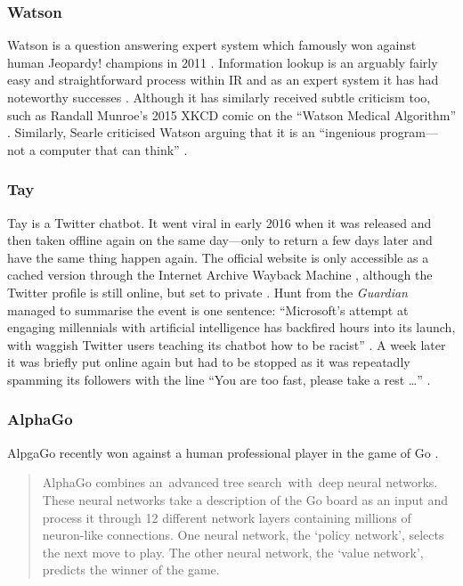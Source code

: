 \subsubsection{Watson} 
Watson is a question answering expert system which famously won against human Jeopardy! champions in 2011 \autocite{IBM2016}. Information lookup is an arguably fairly easy and straightforward process within \ac{IR} and as an expert system it has had noteworthy successes \autocite{Fingas2016}. Although it has similarly received subtle criticism too, such as Randall Munroe's 2015 XKCD comic on the ``Watson Medical Algorithm'' \autocite*{Munroe2015}. Similarly, Searle criticised Watson arguing that it is an ``ingenious program---not a computer that can think'' \autocite*{Searle2011}.

\subsubsection{Tay}
Tay is a Twitter chatbot. It went viral in early 2016 when it was released and then taken offline again on the same day---only to return a few days later and have the same thing happen again. The official website is only accessible as a cached version through the Internet Archive Wayback Machine \autocite{Tay2016}, although the Twitter profile is still online, but set to private \autocite{Tayandyou2016}. Hunt from the \textit{Guardian} managed to summarise the event is one sentence: ``Microsoft's attempt at engaging millennials with artificial intelligence has backfired hours into its launch, with waggish Twitter users teaching its chatbot how to be racist'' \autocite*{Hunt2016}. A week later it was briefly put online again but had to be stopped as it was repeatadly spamming its followers with the line ``You are too fast, please take a rest \ldots'' \autocite{Gibbs2016}.

\subsubsection{AlphaGo}
AlpgaGo recently won against a human professional player in the game of Go \autocite{DeepMind2016,Hassabis2016}. 

\begin{quotation}
  AlphaGo combines an advanced tree search with deep neural networks. These neural networks take a description of the Go board as an input and process it through 12 different network layers containing millions of neuron-like connections. One neural network, the `policy network', selects the next move to play. The other neural network, the `value network', predicts the winner of the game. 
\end{quotation}

